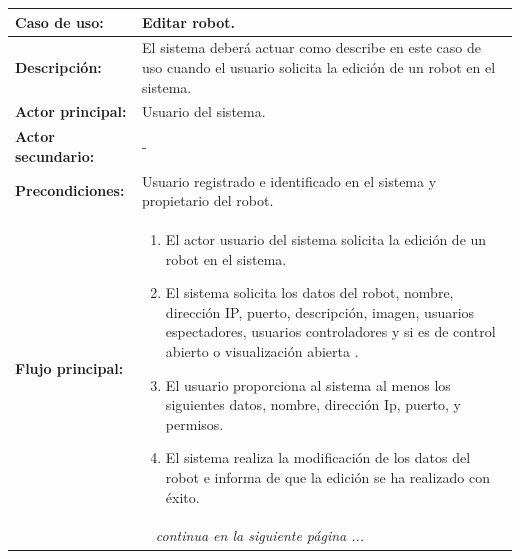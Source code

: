\begin{table}[H]
  \begin{center}
    \begin{tabular}{|p{3.5cm}|p{10cm}|}
      \hline
      {\textbf{Caso de uso:}} & { Editar robot.} \\
      \hline
      {\textbf{Descripción:}} & { El sistema deberá actuar como describe en este caso de uso cuando el usuario solicita la edición de un robot en el sistema.} \\
     \hline
      {\textbf{Actor principal:}} & { Usuario del sistema.} \\
      \hline
      {\textbf{Actor secundario:}} & { - } \\
      \hline
      {\textbf{Precondiciones:}} & { Usuario registrado e identificado en el sistema y propietario del robot. } \\
     \hline   
    {\textbf{Flujo principal:}} & { 
      \begin{enumerate}
	\item El actor usuario del sistema solicita la edición de un robot en el sistema.
	\item El sistema solicita los datos del robot, nombre, dirección IP, puerto, descripción, imagen, usuarios espectadores, usuarios controladores y si es de control abierto o visualización abierta .
	\item El usuario proporciona al sistema al menos los siguientes datos, nombre, dirección Ip, puerto, y permisos.
	\item El sistema realiza la modificación de los datos del robot e informa de que la edición se ha realizado con éxito.
      \end{enumerate}
      } \\
     \hline
     \multicolumn{2}{c}{\emph{continua en la siguiente página ...}}\\
    \end{tabular}
  \end{center}
\end{table}    


